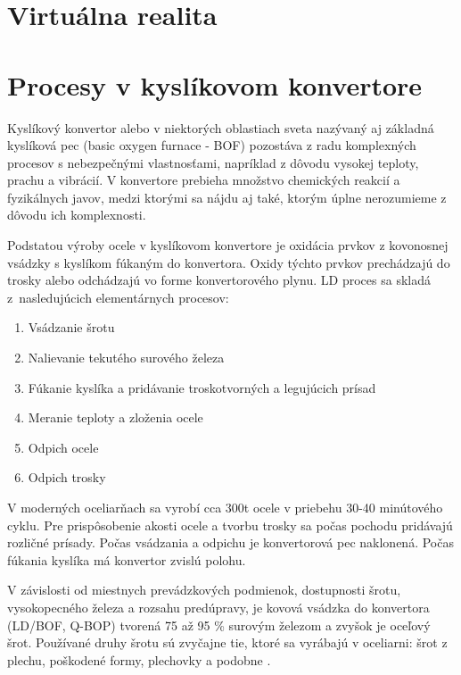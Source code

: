 \documentclass[]{tukediphc}
\begin{document}
\section{Virtuálna realita}





\section{Procesy v kyslíkovom konvertore}

Kyslíkový konvertor alebo v niektorých oblastiach sveta nazývaný aj základná kyslíková pec (basic oxygen furnace - BOF) pozostáva z radu komplexných procesov s nebezpečnými vlastnosťami, napríklad z dôvodu vysokej teploty, prachu a vibrácií. V konvertore prebieha  množstvo chemických reakcií a fyzikálnych javov, medzi ktorými sa nájdu aj také, ktorým úplne nerozumieme z dôvodu ich komplexnosti.

Podstatou výroby ocele v kyslíkovom konvertore je oxidácia prvkov z kovonosnej vsádzky s kyslíkom fúkaným do konvertora. Oxidy týchto prvkov prechádzajú do trosky alebo odchádzajú vo forme konvertorového plynu. LD proces sa skladá z~nasledujúcich elementárnych procesov:

\begin{enumerate}
	\item Vsádzanie šrotu
	\item Nalievanie tekutého surového železa
	\item Fúkanie kyslíka a pridávanie troskotvorných a legujúcich prísad
	\item Meranie teploty a zloženia ocele
	\item Odpich ocele
	\item Odpich trosky
\end{enumerate}

V moderných oceliarňach sa vyrobí cca 300t ocele v priebehu 30-40 minútového cyklu. Pre prispôsobenie akosti ocele a tvorbu trosky sa počas pochodu pridávajú rozličné prísady. Počas vsádzania a odpichu je konvertorová pec naklonená. Počas fúkania kyslíka má konvertor zvislú polohu.

V závislosti od miestnych prevádzkových podmienok, dostupnosti šrotu, vysokopecného železa a rozsahu predúpravy, je kovová vsádzka do konvertora (LD/BOF, Q-BOP) tvorená 75 až 95 \% surovým železom a zvyšok je oceľový šrot. Používané druhy šrotu sú zvyčajne tie, ktoré sa vyrábajú v oceliarni: šrot z plechu, poškodené formy, plechovky a podobne \cite{Turkdogan1996}.
\end{document}

